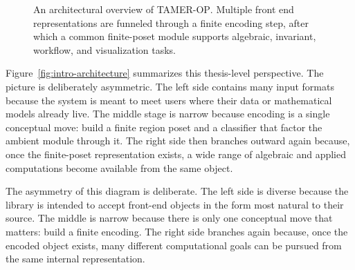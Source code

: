 \documentclass[11pt]{article}
\newcommand{\TAMER}{\textsc{TAMER-OP}}
\theoremstyle{definition}
\theoremstyle{remark}
\begin{document}
\begin{figure}[t]
\caption{An architectural overview of \TAMER. Multiple front end representations are funneled through a finite encoding step, after which a common finite-poset module supports algebraic, invariant, workflow, and visualization tasks.}
\label{fig:system-overview}
\end{figure}

Figure~\ref{fig:intro-architecture} summarizes this thesis-level perspective. The picture is deliberately asymmetric. The left side contains many input formats because the system is meant to meet users where their data or mathematical models already live. The middle stage is narrow because encoding is a single conceptual move: build a finite region poset and a classifier that factor the ambient module through it. The right side then branches outward again because, once the finite-poset representation exists, a wide range of algebraic and applied computations become available from the same object.

The asymmetry of this diagram is deliberate.  The left side is diverse because the library is intended to accept front-end objects in the form most natural to their source.  The middle is narrow because there is only one conceptual move that matters: build a finite encoding.  The right side branches again because, once the encoded object exists, many different computational goals can be pursued from the same internal representation.
\end{document}
